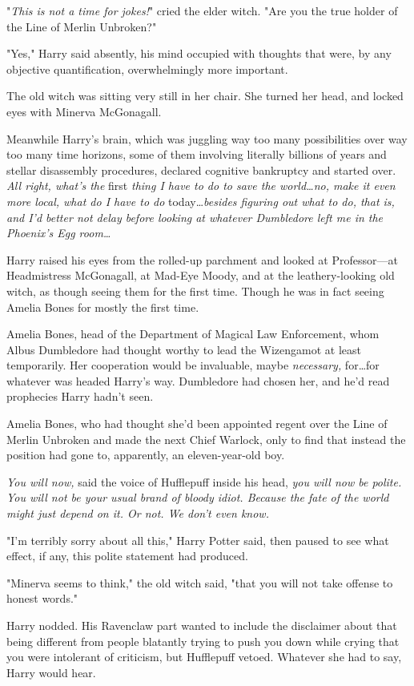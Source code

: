 "\emph{This is not a time for jokes!}" cried the elder witch. "Are you the true
holder of the Line of Merlin Unbroken?"

"Yes," Harry said absently, his mind occupied with thoughts that were, by any
objective quantification, overwhelmingly more important.

The old witch was sitting very still in her chair. She turned her head, and
locked eyes with Minerva McGonagall.

Meanwhile Harry's brain, which was juggling way too many possibilities over way
too many time horizons, some of them involving literally billions of years and
stellar disassembly procedures, declared cognitive bankruptcy and started over.
\emph{All right, what's the} first \emph{thing I have to do to save the
world…no, make it even more local, what do I have to do} today…\emph{besides
figuring out what to do, that is, and I'd better not delay before
looking at whatever Dumbledore left me in the Phoenix's Egg room…}

Harry raised his eyes from the rolled-up parchment and looked at Professor---at
Headmistress McGonagall, at Mad-Eye Moody, and at the leathery-looking old
witch, as though seeing them for the first time. Though he was in fact seeing
Amelia Bones for mostly the first time.

Amelia Bones, head of the Department of Magical Law Enforcement, whom Albus
Dumbledore had thought worthy to lead the Wizengamot at least temporarily. Her
cooperation would be invaluable, maybe \emph{necessary,} for…for
whatever was headed Harry's way. Dumbledore had chosen her, and he'd read
prophecies Harry hadn't seen.

Amelia Bones, who had thought she'd been appointed regent over the Line of
Merlin Unbroken and made the next Chief Warlock, only to find that instead the
position had gone to, apparently, an eleven-year-old boy.

\emph{You will now,} said the voice of Hufflepuff inside his head, \emph{you
will now be polite. You will not be your usual brand of bloody idiot. Because
the fate of the world might just depend on it. Or not. We don't even know.}

"I'm terribly sorry about all this," Harry Potter said, then paused to see what
effect, if any, this polite statement had produced.

"Minerva seems to think," the old witch said, "that you will not take offense
to honest words."

Harry nodded. His Ravenclaw part wanted to include the disclaimer about that
being different from people blatantly trying to push you down while crying that
you were intolerant of criticism, but Hufflepuff vetoed. Whatever she had to
say, Harry would hear.

